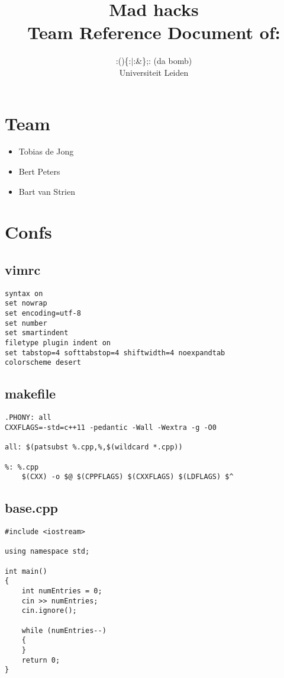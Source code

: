 \documentclass[10pt]{article}
\title{Mad hacks\\[1cm]
\small{Team Reference Document of:}}
\author{:()\{:$\vert$:\&\};: (da bomb)\\[1cm]
	\small{Universiteit Leiden}}
\begin{document}
\fontsize{10}{12}


\maketitle
\newpage
\section{Team}
\begin{itemize}
\item Tobias de Jong
\item Bert Peters
\item Bart van Strien
\end{itemize}

\section{Confs}
\subsection{vimrc}
\begin{lstlisting}
syntax on
set nowrap
set encoding=utf-8
set number
set smartindent
filetype plugin indent on
set tabstop=4 softtabstop=4 shiftwidth=4 noexpandtab
colorscheme desert
\end{lstlisting}

\subsection{makefile}
\begin{lstlisting}
.PHONY: all
CXXFLAGS=-std=c++11 -pedantic -Wall -Wextra -g -O0

all: $(patsubst %.cpp,%,$(wildcard *.cpp))

%: %.cpp
	$(CXX) -o $@ $(CPPFLAGS) $(CXXFLAGS) $(LDFLAGS) $^
\end{lstlisting}

\subsection{base.cpp}
\begin{lstlisting}
#include <iostream>

using namespace std;

int main()
{
	int numEntries = 0;
	cin >> numEntries;
	cin.ignore();
	
	while (numEntries--)
	{
	}
	return 0;
}
\end{lstlisting}
\end{document}
